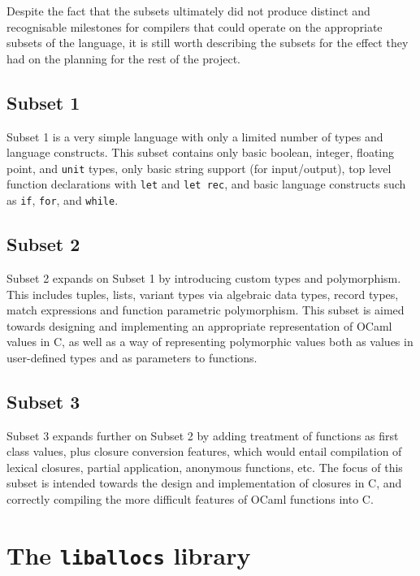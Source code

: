 \documentclass[12pt,a4paper,twoside,openright]{report}
\begin{document}
Despite the fact that the subsets ultimately did not produce distinct and 
recognisable milestones for compilers that could operate on the appropriate 
subsets of the language, it is still worth describing the subsets for the 
effect they had on the planning for the rest of the project.

\subsection{Subset 1}

Subset 1 is a very simple language with only a limited number of types and 
language constructs. This subset contains only basic boolean, integer, floating 
point, and \texttt{unit} types, only basic string support (for input/output), 
top level function declarations with \texttt{let} and \texttt{let rec}, and 
basic language constructs such as \texttt{if}, \texttt{for}, and \texttt{while}.

\subsection{Subset 2}

Subset 2 expands on Subset 1 by introducing custom types and polymorphism. This 
includes tuples, lists, variant types via algebraic data types, record types, 
match expressions and function parametric polymorphism. This subset is aimed 
towards designing and implementing an appropriate representation of OCaml 
values in C, as well as a way of representing polymorphic values both as values 
in user-defined types and as parameters to functions.

\subsection{Subset 3}

Subset 3 expands further on Subset 2 by adding treatment of functions as first
class values, plus closure conversion features, which would entail compilation
of lexical closures, partial application, anonymous functions, etc. The focus of
this subset is intended towards the design and implementation of closures in C,
and correctly compiling the more difficult features of OCaml functions into C.

\section{The \texttt{liballocs} library}
\end{document}

